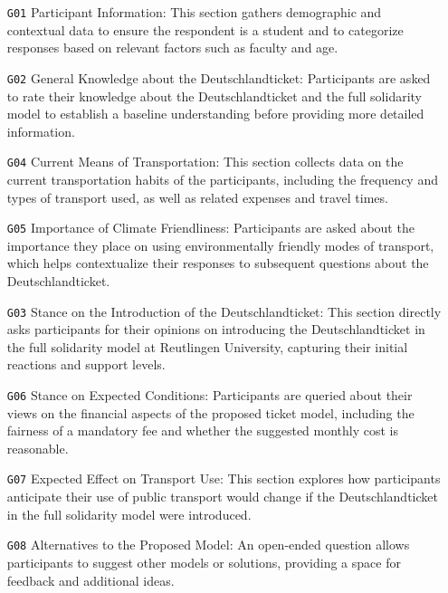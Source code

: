 \begin{itemize}
    \item[\texttt{G01}] Participant Information:
    This section gathers demographic and contextual data to ensure the respondent is a student and to categorize responses based on relevant factors such as faculty and age.\\

    \item[\texttt{G02}] General Knowledge about the Deutschlandticket: Participants are asked to rate their knowledge about the Deutschlandticket and the full solidarity model to establish a baseline understanding before providing more detailed information.\\

    \item[\texttt{G04}] Current Means of Transportation: This section collects data on the current transportation habits of the participants, including the frequency and types of transport used, as well as related expenses and travel times.\\

    \item[\texttt{G05}] Importance of Climate Friendliness: Participants are asked about the importance they place on using environmentally friendly modes of transport, which helps contextualize their responses to subsequent questions about the Deutschlandticket.\\
    
    \item[\texttt{G03}] Stance on the Introduction of the Deutschlandticket: This section directly asks participants for their opinions on introducing the Deutschlandticket in the full solidarity model at Reutlingen University, capturing their initial reactions and support levels.\\

    \item[\texttt{G06}] Stance on Expected Conditions: Participants are queried about their views on the financial aspects of the proposed ticket model, including the fairness of a mandatory fee and whether the suggested monthly cost is reasonable.\\

    \item[\texttt{G07}] Expected Effect on Transport Use: This section explores how participants anticipate their use of public transport would change if the Deutschlandticket in the full solidarity model were introduced.\\

    \item[\texttt{G08}] Alternatives to the Proposed Model: An open-ended question allows participants to suggest other models or solutions, providing a space for feedback and additional ideas.\\
\end{itemize}

